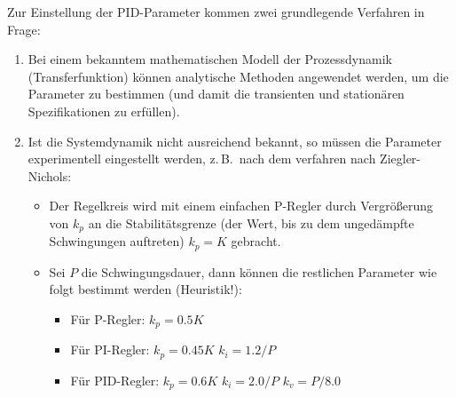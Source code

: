 \documentclass[a4paper, 11pt, accentcolor = tud3b]{tudreport}
\newcommand{\zB}{z.\,B.~}
\begin{document}
					Zur Einstellung der PID-Parameter kommen zwei grundlegende Verfahren in Frage:
					\begin{enumerate}
						\item Bei einem bekanntem mathematischen Modell der Prozessdynamik (Transferfunktion) können analytische Methoden angewendet werden, um die Parameter zu bestimmen (und damit die transienten und stationären Spezifikationen zu erfüllen).
						\item Ist die Systemdynamik nicht ausreichend bekannt, so müssen die Parameter experimentell eingestellt werden, \zB nach dem verfahren nach Ziegler-Nichols:
							\begin{itemize}
								\item Der Regelkreis wird mit einem einfachen P-Regler durch Vergrößerung von \(k_p\) an die Stabilitätsgrenze (der Wert, bis zu dem ungedämpfte Schwingungen auftreten) \( k_p = K \) gebracht.
								\item Sei \(P\) die Schwingungsdauer, dann können die restlichen Parameter wie folgt bestimmt werden (Heuristik!):
									\begin{itemize}
										\item Für P-Regler:   \tabto{3cm} \( k_p = 0.5K \)
										\item Für PI-Regler:  \tabto{3cm} \( k_p = 0.45K \) \tabto{5.5cm} \( k_i = 1.2 / P \)
										\item Für PID-Regler: \tabto{3cm} \( k_p = 0.6K \)  \tabto{5.5cm} \( k_i = 2.0 / P \) \tabto{8cm} \( k_v = P / 8.0 \)
									\end{itemize}
							\end{itemize}
					\end{enumerate}
\end{document}
